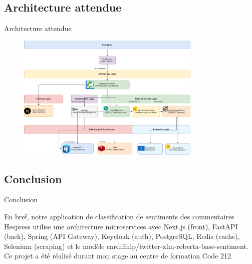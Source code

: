 \subsection{Architecture attendue}
\begin{frame}{Architecture attendue}
    \begin{figure}[H]
        \centering
        \includegraphics[height=6cm]{assets/images/arch.png}
    \end{figure}
\end{frame}

\subsection{Conclusion}
\begin{frame}{Conclusion}

    En bref, notre application de classification de sentiments des commentaires Hespress utilise une architecture microservices avec Next.js (front), FastAPI (back), Spring (API Gateway), Keycloak (auth), PostgreSQL, Redis (cache), Selenium (scraping) et le modèle cardiffnlp/twitter-xlm-roberta-base-sentiment. Ce projet a été réalisé durant mon stage au centre de formation Code 212.
\end{frame}
